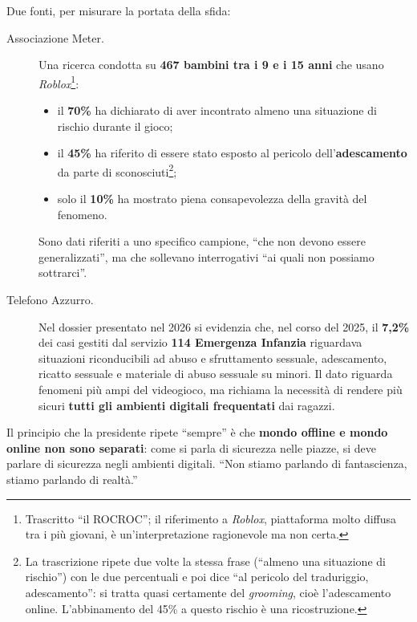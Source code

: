 Due fonti, per misurare la portata della sfida:
\begin{description}
  \item[Associazione Meter.] Una ricerca condotta su \textbf{467 bambini tra i
        9 e i 15 anni} che usano \emph{Roblox}\footnote{Trascritto ``il
        ROCROC''; il riferimento a \emph{Roblox}, piattaforma molto diffusa tra
        i più giovani, è un'interpretazione ragionevole ma non certa.}:
        \begin{itemize}
          \item il \textbf{70\%} ha dichiarato di aver incontrato almeno una
                situazione di rischio durante il gioco;
          \item il \textbf{45\%} ha riferito di essere stato esposto al
                pericolo dell'\textbf{adescamento} da parte di
                sconosciuti\footnote{La trascrizione ripete due volte la stessa
                frase (``almeno una situazione di rischio'') con le due
                percentuali e poi dice ``al pericolo del traduriggio,
                adescamento'': si tratta quasi certamente del \emph{grooming},
                cioè l'adescamento online. L'abbinamento del 45\% a questo
                rischio è una ricostruzione.};
          \item solo il \textbf{10\%} ha mostrato piena consapevolezza della
                gravità del fenomeno.
        \end{itemize}
        Sono dati riferiti a uno specifico campione, ``che non devono essere
        generalizzati'', ma che sollevano interrogativi ``ai quali non possiamo
        sottrarci''.
  \item[Telefono Azzurro.] Nel dossier presentato nel 2026 si evidenzia che,
        nel corso del 2025, il \textbf{7,2\%} dei casi gestiti dal servizio
        \textbf{114 Emergenza Infanzia} riguardava situazioni riconducibili ad
        abuso e sfruttamento sessuale, adescamento, ricatto sessuale e
        materiale di abuso sessuale su minori. Il dato riguarda fenomeni più
        ampi del videogioco, ma richiama la necessità di rendere più sicuri
        \textbf{tutti gli ambienti digitali frequentati} dai ragazzi.
\end{description}

Il principio che la presidente ripete ``sempre'' è che \textbf{mondo offline e
mondo online non sono separati}: come si parla di sicurezza nelle piazze, si
deve parlare di sicurezza negli ambienti digitali. ``Non stiamo parlando di
fantascienza, stiamo parlando di realtà.''

